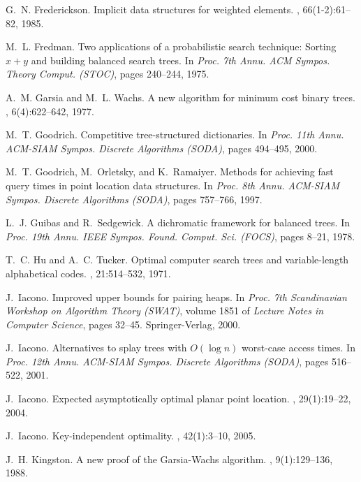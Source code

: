 \documentclass[11pt]{article}
\begin{document}
\begin{thebibliography}{10}
G.~N. Frederickson.
\newblock Implicit data structures for weighted elements.
, 66(1-2):61--82, 1985.

M.~L. Fredman.
\newblock Two applications of a probabilistic search technique: Sorting $x+y$
  and building balanced search trees.
\newblock In {\em Proc. 7th Annu. ACM Sympos. Theory Comput. (STOC)}, pages
  240--244, 1975.

A.~M. Garsia and M.~L. Wachs.
\newblock A new algorithm for minimum cost binary trees.
, 6(4):622--642, 1977.

M.~T. Goodrich.
\newblock Competitive tree-structured dictionaries.
\newblock In {\em Proc. 11th Annu. ACM-SIAM Sympos. Discrete Algorithms
  (SODA)}, pages 494--495, 2000.

M.~T. Goodrich, M.~Orletsky, and K.~Ramaiyer.
\newblock Methods for achieving fast query times in point location data
  structures.
\newblock In {\em Proc. 8th Annu. ACM-SIAM Sympos. Discrete Algorithms (SODA)},
  pages 757--766, 1997.

L.~J. Guibas and R.~Sedgewick.
\newblock A dichromatic framework for balanced trees.
\newblock In {\em Proc. 19th Annu. IEEE Sympos. Found. Comput. Sci. (FOCS)},
  pages 8--21, 1978.

T.~C. Hu and A.~C. Tucker.
\newblock Optimal computer search trees and variable-length alphabetical codes.
, 21:514--532, 1971.

J.~Iacono.
\newblock Improved upper bounds for pairing heaps.
\newblock In {\em Proc. 7th Scandinavian Workshop on Algorithm Theory (SWAT)},
  volume 1851 of {\em Lecture Notes in Computer Science}, pages 32--45.
  Springer-Verlag, 2000.

J.~Iacono.
\newblock Alternatives to splay trees with {$O(\log n)$} worst-case access
  times.
\newblock In {\em Proc. 12th Annu. ACM-SIAM Sympos. Discrete Algorithms
  (SODA)}, pages 516--522, 2001.

J.~Iacono.
\newblock Expected asymptotically optimal planar point location.
, 29(1):19--22, 2004.

J.~Iacono.
\newblock Key-independent optimality.
, 42(1):3--10, 2005.

J.~H. Kingston.
\newblock A new proof of the {G}arsia-{W}achs algorithm.
, 9(1):129--136, 1988.


\end{thebibliography}
\end{document}
